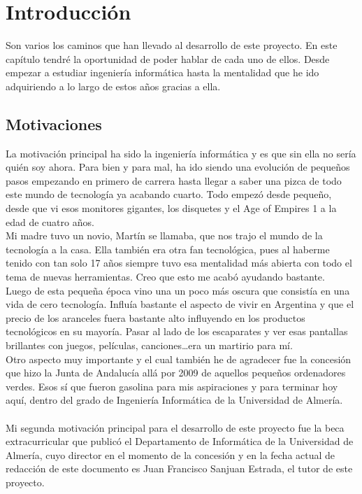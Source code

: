 \chapter{Introducción}

Son varios los caminos que han llevado al desarrollo de este proyecto. En este capítulo tendré la oportunidad de poder hablar de cada uno de ellos. Desde empezar a estudiar ingeniería informática hasta la mentalidad que he ido adquiriendo a lo largo de estos años gracias a ella.

\section{Motivaciones}

La motivación principal ha sido la ingeniería informática y es que sin ella no sería quién soy ahora. Para bien y para mal, ha ido siendo una evolución de pequeños pasos empezando en primero de carrera hasta llegar a saber una pizca de todo este mundo de tecnología ya acabando cuarto. Todo empezó desde pequeño, desde que vi esos monitores gigantes, los disquetes y el Age of Empires 1 a la edad de cuatro años. 
\\Mi madre tuvo un novio, Martín se llamaba, que nos trajo el mundo de la tecnología a la casa. Ella también era otra fan tecnológica, pues al haberme tenido con tan solo 17 años siempre tuvo esa mentalidad más abierta con todo el tema de nuevas herramientas. Creo que esto me acabó ayudando bastante.
\\Luego de esta pequeña época vino una un poco más oscura que consistía en una vida de cero tecnología. Influía bastante el aspecto de vivir en Argentina y que el precio de los aranceles fuera bastante alto influyendo en los productos tecnológicos en su mayoría. Pasar al lado de los escaparates y ver esas pantallas brillantes con juegos, películas, canciones\ldots era un martirio para mí.
\\Otro aspecto muy importante y el cual también he de agradecer fue la concesión que hizo la Junta de Andalucía allá por 2009 de aquellos pequeños ordenadores verdes. Esos sí que fueron gasolina para mis aspiraciones y para terminar hoy aquí, dentro del grado de Ingeniería Informática de la Universidad de Almería.
\\\\Mi segunda motivación principal para el desarrollo de este proyecto fue la beca extracurricular que publicó el Departamento de Informática de la Universidad de Almería, cuyo director en el momento de la concesión y en la fecha actual de redacción de este documento es Juan Francisco Sanjuan Estrada, el tutor de este proyecto.
